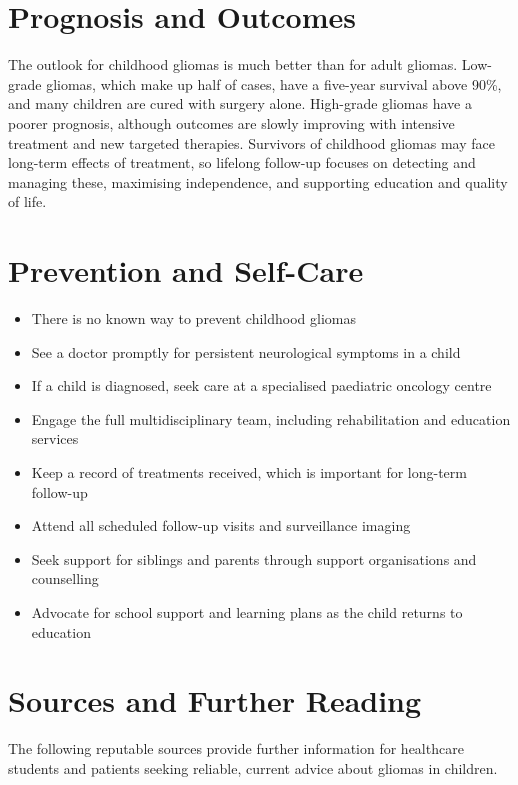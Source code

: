 \section*{Prognosis and Outcomes}
The outlook for childhood gliomas is much better than for adult gliomas. Low-grade gliomas, which make up half of cases, have a five-year survival above 90\%, and many children are cured with surgery alone. High-grade gliomas have a poorer prognosis, although outcomes are slowly improving with intensive treatment and new targeted therapies. Survivors of childhood gliomas may face long-term effects of treatment, so lifelong follow-up focuses on detecting and managing these, maximising independence, and supporting education and quality of life.

\section*{Prevention and Self-Care}
\begin{itemize}
    \item There is no known way to prevent childhood gliomas
    \item See a doctor promptly for persistent neurological symptoms in a child
    \item If a child is diagnosed, seek care at a specialised paediatric oncology centre
    \item Engage the full multidisciplinary team, including rehabilitation and education services
    \item Keep a record of treatments received, which is important for long-term follow-up
    \item Attend all scheduled follow-up visits and surveillance imaging
    \item Seek support for siblings and parents through support organisations and counselling
    \item Advocate for school support and learning plans as the child returns to education
\end{itemize}

\section*{Sources and Further Reading}
The following reputable sources provide further information for healthcare students and patients seeking reliable, current advice about gliomas in children.

